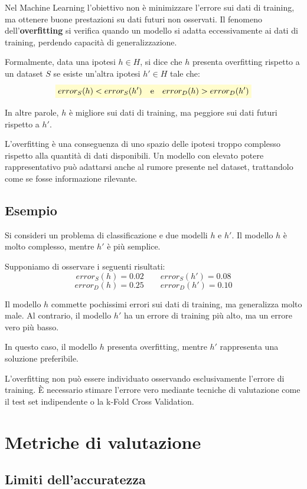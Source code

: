 \documentclass[a4paper,12pt]{report}
\newcommand{\highlight}[1]{%
\colorbox{yellow!20}{$\displaystyle #1$}%
}
\begin{document}
Nel Machine Learning l’obiettivo non è minimizzare l’errore sui dati di training, ma ottenere buone prestazioni su dati futuri non osservati.
Il fenomeno dell’\textbf{overfitting} si verifica quando un modello si adatta eccessivamente ai dati di training, perdendo capacità di generalizzazione.

Formalmente, data una ipotesi \( h \in H \), si dice che \( h \) presenta overfitting rispetto a un dataset \( S \) se esiste un’altra ipotesi \( h' \in H \) tale che:
\[
\highlight{
error_S(h) < error_S(h') \quad \text{e} \quad error_D(h) > error_D(h')
}
\]

In altre parole, \( h \) è migliore sui dati di training, ma peggiore sui dati futuri rispetto a \( h' \).

L’overfitting è una conseguenza di uno spazio delle ipotesi troppo complesso rispetto alla quantità di dati disponibili.
Un modello con elevato potere rappresentativo può adattarsi anche al rumore presente nel dataset, trattandolo come se fosse informazione rilevante.


\subsection*{Esempio}

Si consideri un problema di classificazione e due modelli \( h \) e \( h' \).
Il modello \( h \) è molto complesso, mentre \( h' \) è più semplice.

Supponiamo di osservare i seguenti risultati:
\[
error_S(h) = 0.02 \qquad error_S(h') = 0.08
\]
\[
error_D(h) = 0.25 \qquad error_D(h') = 0.10
\]

Il modello \( h \) commette pochissimi errori sui dati di training, ma generalizza molto male.
Al contrario, il modello \( h' \) ha un errore di training più alto, ma un errore vero più basso.

In questo caso, il modello \( h \) presenta overfitting, mentre \( h' \) rappresenta una soluzione preferibile.

L’overfitting non può essere individuato osservando esclusivamente l’errore di training.
È necessario stimare l’errore vero mediante tecniche di valutazione come il test set indipendente o la k-Fold Cross Validation.

\section{Metriche di valutazione}
\subsection{Limiti dell’accuratezza}
\end{document}
